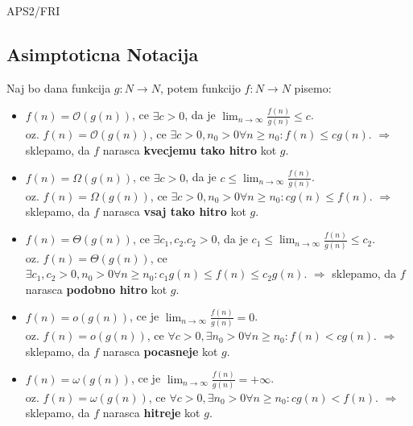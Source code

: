 \documentclass{article}
\begin{document}
\begin{center}
    {\small APS2/FRI \par}
\end{center}


\begin{multicols}{2}

\section{Asimptoticna Notacija}

Naj bo dana funkcija $g: N \rightarrow N$, potem funkcijo $f: N \rightarrow N$ pisemo:
\begin{itemize}
    \item $f(n) = \mathcal{O}(g(n))$, ce $\exists c > 0$, da je $\lim_{n \rightarrow \infty} \frac{f(n)}{g(n)} \leq c$.\\
        oz. $f(n) = \mathcal{O}(g(n))$, ce $\exists c > 0, n_0 > 0  \forall n \geq n_0: f(n) \leq cg(n)$. $\Rightarrow$
        sklepamo, da $f$ narasca \textbf{kvecjemu tako hitro} kot $g$.
    \item $f(n) = \Omega(g(n))$, ce $\exists c > 0$, da je $c \leq \lim_{n \rightarrow \infty} \frac{f(n)}{g(n)}$.\\
        oz. $f(n) = \Omega(g(n))$, ce $\exists c > 0, n_0 > 0  \forall n \geq n_0: cg(n) \leq f(n)$. $\Rightarrow$
        sklepamo, da $f$ narasca \textbf{vsaj tako hitro} kot $g$.
    \item $f(n) = \Theta(g(n))$, ce $\exists c_1, c_2. c_2 > 0$, da je $c_1 \leq \lim_{n \rightarrow \infty} \frac{f(n)}{g(n)} \leq c_2$.\\
        oz. $f(n) = \Theta(g(n))$, ce $\exists c_1, c_2 > 0, n_0 > 0  \forall n \geq n_0: c_1 g(n) \leq f(n) \leq c_2 g(n)$. $\Rightarrow$
        sklepamo, da $f$ narasca \textbf{podobno hitro} kot $g$.
    \item $f(n) = o(g(n))$, ce je $\lim_{n \rightarrow \infty} \frac{f(n)}{g(n)} = 0$.\\
        oz. $f(n) = o(g(n))$, ce $\forall c > 0, \exists n_0 > 0  \forall n \geq n_0: f(n) < cg(n)$. $\Rightarrow$
        sklepamo, da $f$ narasca \textbf{pocasneje} kot $g$.
    \item $f(n) = \omega(g(n))$, ce  je $ \lim_{n \rightarrow \infty} \frac{f(n)}{g(n)} = + \infty$.\\
        oz. $f(n) = \omega(g(n))$, ce $\forall c > 0, \exists n_0 > 0  \forall n \geq n_0: cg(n) < f(n)$. $\Rightarrow$
        sklepamo, da $f$ narasca \textbf{hitreje} kot $g$.
\end{itemize}


\end{multicols}
\end{document}
